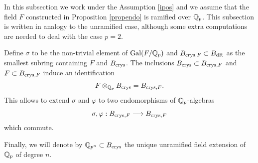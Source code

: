 In this subsection we work under the Assumption  \ref{ipos} and we assume that the field $F$  constructed in  Proposition \ref{propendo} is ramified over $\mathbb{Q}_p$. This subsection is written in  analogy to the unramified case, although  some extra computations are needed to deal with the case $p=2$.

Define $\sigma$ to be the  non-trivial element of $\textnormal{Gal}(F/\mathbb{Q}_p)$ and $  B_{\textnormal{crys},F} \subset B_{\mathrm{dR}}$ as the smallest subring containing $F$ and  $B_{\textnormal{crys}}$.
The inclusions   $  B_{\textnormal{crys}} \subset B_{\textnormal{crys},F}$ and  $  F \subset B_{\textnormal{crys},F}$ induce an identification
\[F\otimes_{\mathbb{Q}_p} B_{\textnormal{crys}}=B_{\textnormal{crys},F}. \]
This allows to extend $\sigma$ and $\varphi$ to two endomorphisms of $\mathbb{Q}_p$-algebras
\[   \sigma, \varphi : B_{\textnormal{crys},F}    \longrightarrow B_{\textnormal{crys},F} \]
which commute.

Finally, we will denote by $\mathbb{Q}_{p^n}\subset B_{\textnormal{crys}}$ the unique unramified field extension of $\mathbb{Q}_p$ of degree $n$.


